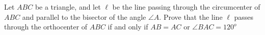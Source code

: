 Let $ABC$ be a triangle, and let $\ell$ be the line passing through the circumcenter of $ABC$ and parallel to the bisector of the angle $\angle A$. Prove that the line $\ell$  passes through the orthocenter of $ABC$ if and only if $AB = AC$ or $\angle BAC = 120^o$